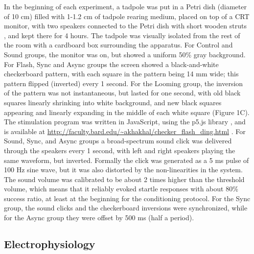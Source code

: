 \documentclass{article}
\begin{document}
In the beginning of each experiment, a tadpole was put in a Petri dish (diameter of 10 cm) filled with 1-1.2 cm of tadpole rearing medium, placed on top of a CRT monitor, with two speakers connected to the Petri dish with short wooden struts \citep{james2015,truszkowski2017}, and kept there for 4 hours. The tadpole was visually isolated from the rest of the room with a cardboard box surrounding the apparatus. For Control and Sound groups, the monitor was on, but showed a uniform 50\% gray background. For Flash, Sync and Async groups the screen showed a black-and-white checkerboard pattern, with each square in the pattern being 14 mm wide; this pattern flipped (inverted) every 1 second. For the Looming group, the inversion of the pattern was not instantaneous, but lasted for one second, with old black squares linearly shrinking into white background, and new black squares appearing and linearly expanding in the middle of each white square (Figure 1C). The stimulation program was written in JavaScript, using the p5.js library \citep{mccarthy2015}, and is available at \url{http://faculty.bard.edu/~akhakhal/checker_flash_ding.html} . For Sound, Sync, and Async groups a broad-spectrum sound click was delivered through the speakers every 1 second, with left and right speakers playing the same waveform, but inverted. Formally the click was generated as a 5 ms pulse of 100 Hz sine wave, but it was also distorted by the non-linearities in the system. The sound volume was calibrated to be about 2 times higher than the threshold volume, which means that it reliably evoked startle responses with about 80\% success ratio, at least at the beginning for the conditioning protocol. For the Sync group, the sound clicks and the checkerboard inversions were synchronized, while for the Async group they were offset by 500 ms (half a period).

\subsection*{Electrophysiology}
\end{document}
